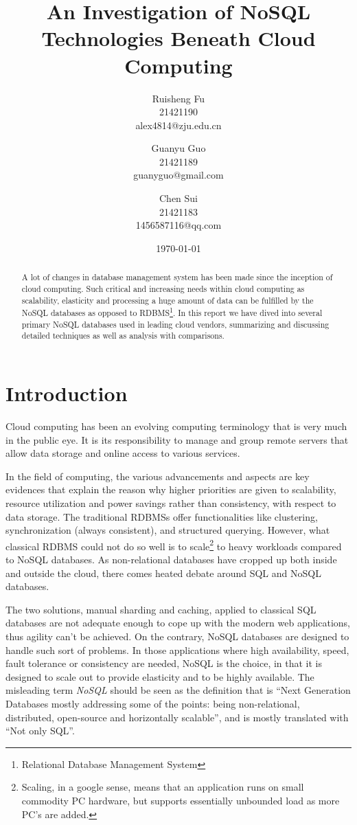 \documentclass[letter,twocolumn]{article}
\author{Ruisheng Fu\\21421190\\alex4814@zju.edu.cn
\and
Guanyu Guo\\21421189\\guanyguo@gmail.com
\and
Chen Sui\\21421183\\1456587116@qq.com}
\title{An Investigation of NoSQL Technologies Beneath Cloud Computing}
\date{\today}
\begin{document}
\maketitle

\begin{abstract}
A lot of changes in database management system has been made since the inception of cloud computing. Such critical and increasing needs within cloud computing as scalability, elasticity and  processing a huge amount of data can be fulfilled by the NoSQL databases as opposed to RDBMS\footnote{Relational Database Management System}. In this report we have dived into several primary NoSQL databases used in leading cloud vendors, summarizing and discussing detailed techniques as well as analysis with comparisons.
\end{abstract}

\section{Introduction}
Cloud computing has been an evolving computing terminology that is very much in the public eye. It is its responsibility to manage and group remote servers that allow data storage and online access to various services.

In the field of computing, the various advancements and aspects are key evidences that explain the reason why higher priorities are given to scalability, resource utilization and power savings rather than consistency, with respect to data storage. The traditional RDBMSs offer functionalities like clustering, synchronization (always consistent), and structured querying. However, what classical RDBMS could not do so well is to scale\footnote{Scaling, in a google sense, means that an application runs on small commodity PC hardware, but supports essentially unbounded load as more PC’s are added. } to heavy workloads compared to NoSQL databases. As non-relational databases have cropped up both inside and outside the cloud, there comes heated debate around SQL and NoSQL databases.\citep{Bain2009}

The two solutions, manual sharding and caching, applied to classical SQL databases are not adequate enough to cope up with the modern web applications, thus agility can't be achieved. On the contrary, NoSQL databases are designed to handle such sort of problems. In those applications where high availability, speed, fault tolerance or consistency are needed, NoSQL is the choice, in that it is designed to scale out to provide elasticity and to be highly available. The misleading term \textit{NoSQL} should be seen as the definition\citep{Unknown2012} that is ``Next Generation Databases mostly addressing some of the points: being non-relational, distributed, open-source and horizontally scalable'', and is mostly translated with ``Not only SQL''.
\end{document}
